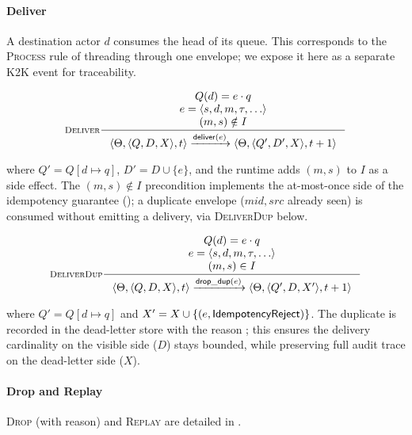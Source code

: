 \paragraph{Deliver}
A destination actor \(d\) consumes the head of its queue.  This
corresponds to the \textsc{Process} rule of 
threading through one envelope; we expose it here as a separate K2K
event for traceability.

\begin{equation}
\inference[\textsc{Deliver}]
{
  Q(d) = e \cdot q \\
  e = \langle s, d, m, \tau, \ldots\rangle \\
  (m, s) \notin I
}
{
  \langle \Theta, \langle Q, D, X\rangle, t\rangle
  \trans{\mathsf{deliver}(e)}
  \langle \Theta, \langle Q', D', X\rangle, t+1\rangle
}
\label{rule:k2k-deliver}
\end{equation}

\noindent where \(Q' = Q[d \mapsto q]\), \(D' = D \cup \{e\}\), and
the runtime adds \((m, s)\) to \(I\) as a side effect.  The
\((m, s) \notin I\) precondition implements the at-most-once side of
the idempotency guarantee (); a duplicate
envelope (\(\mathit{mid}, \mathit{src}\) already seen) is consumed
without emitting a delivery, via \textsc{DeliverDup} below.

\begin{equation}
\inference[\textsc{DeliverDup}]
{
  Q(d) = e \cdot q \\
  e = \langle s, d, m, \tau, \ldots\rangle \\
  (m, s) \in I
}
{
  \langle \Theta, \langle Q, D, X\rangle, t\rangle
  \trans{\mathsf{drop\_dup}(e)}
  \langle \Theta, \langle Q', D, X'\rangle, t+1\rangle
}
\label{rule:k2k-deliver-dup}
\end{equation}

\noindent where \(Q' = Q[d \mapsto q]\) and \(X' = X \cup
\{(e, \mathsf{IdempotencyReject})\}\).  The duplicate is recorded in
the dead-letter store with the reason ; this
ensures the delivery cardinality on the visible side
(\(D\)) stays bounded, while preserving full audit trace on the
dead-letter side (\(X\)).

\paragraph{Drop and Replay}
\textsc{Drop} (with reason) and \textsc{Replay} are detailed in
.

